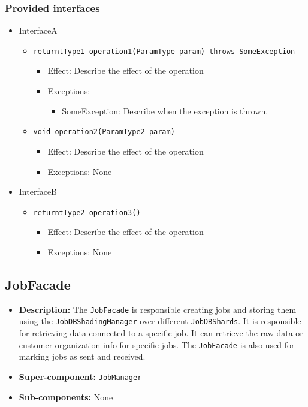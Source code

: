 \documentclass[a4paper,10pt]{article}
\begin{document}
\subsubsection*{Provided interfaces}
\begin{itemize}
    \item InterfaceA
    \begin{itemize}
        \item \texttt{returntType1 operation1(ParamType param) throws SomeException}
        \begin{itemize}
            \item Effect: Describe the effect of the operation
            \item Exceptions:
            \begin{itemize}
                \item SomeException: Describe when the exception is thrown.
            \end{itemize}
		\end{itemize}
        \item \texttt{void operation2(ParamType2 param)}
        \begin{itemize}
            \item Effect: Describe the effect of the operation
            \item Exceptions: None
        \end{itemize}
    \end{itemize}

    \item InterfaceB
    \begin{itemize}
        \item \texttt{returntType2 operation3()}
        \begin{itemize}
            \item Effect: Describe the effect of the operation
            \item Exceptions: None
        \end{itemize}
    \end{itemize}
\end{itemize}


\subsection{JobFacade}
\begin{itemize}
    \item \textbf{Description:} The \texttt{JobFacade} is responsible creating jobs and storing them using the \texttt{JobDBShadingManager} over different \texttt{JobDBShards}. It is responsible for retrieving data connected to a specific job. It can retrieve the raw data or customer organization info for specific jobs. The \texttt{JobFacade} is also used for marking jobs as sent and received.
    \item \textbf{Super-component:} \texttt{JobManager}
    \item \textbf{Sub-components:} None
\end{itemize}
\end{document}
